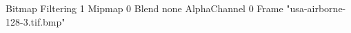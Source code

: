 {Bitmap
	{Filtering 1}
	{Mipmap 0}
	{Blend none}
	{AlphaChannel 0}
	{Frame "usa-airborne-128-3.tif.bmp"}
}
